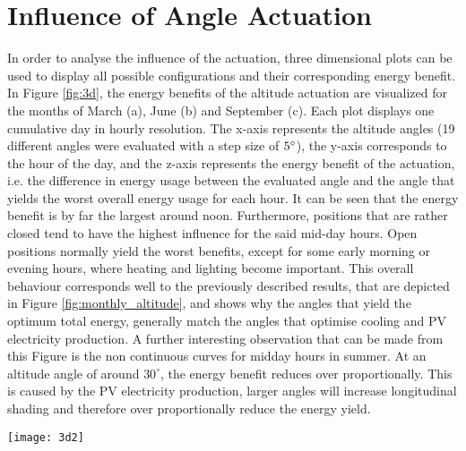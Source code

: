 \section{Influence of Angle Actuation}
\label{s:actuation}
	In order to analyse the influence of the actuation, three dimensional plots can be used to display all possible configurations and their corresponding energy benefit. In Figure \ref{fig:3d}, the energy benefits of the altitude actuation are visualized for the months of March (a), June (b) and September (c). Each plot displays one cumulative day in hourly resolution. The x-axis  represents the altitude angles (19 different angles were evaluated with a step size of $5\degree$), the y-axis corresponds to the hour of the day, and the z-axis represents the energy benefit of the actuation, i.e. the difference in energy usage between the evaluated angle and the angle that yields the worst overall energy usage for each hour. It can be seen that the energy benefit is by far the largest around noon. Furthermore, positions that are rather closed tend to have the highest influence for the said mid-day hours. Open positions normally yield the worst benefits, except for some early morning or evening hours, where heating and lighting become important. 
	This overall behaviour corresponds well to the previously described results, that are depicted in Figure \ref{fig:monthly_altitude}, and shows why the angles that yield the optimum total energy, generally match the angles that optimise cooling and PV electricity production. A further interesting observation that can be made from this Figure is the non continuous curves for midday hours in summer. At an altitude angle of around $30^{\circ}$, the energy benefit reduces over proportionally. This is caused by the PV electricity production, larger angles will increase longitudinal shading and therefore over proportionally reduce the energy yield. 

	\begin{figure*}
		\begin{center}
		\texttt{[image: 3d2]}
		\caption{Energy benefits of the altitude actuation for the months of March (a), June (b) and September (c). Each plot displays one cumulative day in hourly resolution. The x-axis  represents the altitude angles, the y-axis corresponds to the hour of the day, and the z-axis represents the energy benefit of the actuation, i.e. the difference in energy usage between the evaluated angle and the angle that yields the worst overall energy usage for each hour.}
		\label{fig:3d}
		\end{center}
	\end{figure*}




